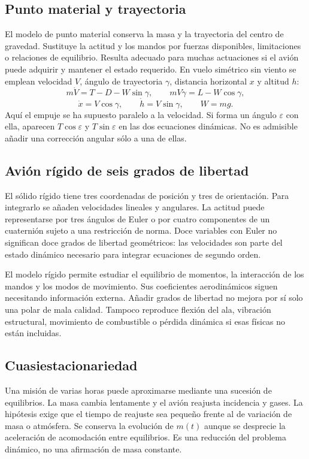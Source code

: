 \subsection{Punto material y trayectoria}
El modelo de punto material conserva la masa y la trayectoria del centro de gravedad. Sustituye la actitud y los mandos por fuerzas disponibles, limitaciones o relaciones de equilibrio. Resulta adecuado para muchas actuaciones si el avión puede adquirir y mantener el estado requerido. En vuelo simétrico sin viento se emplean velocidad $V$, ángulo de trayectoria $\gamma$, distancia horizontal $x$ y altitud $h$:
\begin{equation}
 m\dot V=T-D-W\sin\gamma,\qquad
 mV\dot\gamma=L-W\cos\gamma,
 \label{eq:punto-masa}
\end{equation}
\begin{equation}
 \dot x=V\cos\gamma,\qquad \dot h=V\sin\gamma,\qquad W=mg.
\end{equation}
Aquí el empuje se ha supuesto paralelo a la velocidad. Si forma un ángulo $\varepsilon$ con ella, aparecen $T\cos\varepsilon$ y $T\sin\varepsilon$ en las dos ecuaciones dinámicas. No es admisible añadir una corrección angular sólo a una de ellas.

\subsection{Avión rígido de seis grados de libertad}
El sólido rígido tiene tres coordenadas de posición y tres de orientación. Para integrarlo se añaden velocidades lineales y angulares. La actitud puede representarse por tres ángulos de Euler o por cuatro componentes de un cuaternión sujeto a una restricción de norma. Doce variables con Euler no significan doce grados de libertad geométricos: las velocidades son parte del estado dinámico necesario para integrar ecuaciones de segundo orden.

El modelo rígido permite estudiar el equilibrio de momentos, la interacción de los mandos y los modos de movimiento. Sus coeficientes aerodinámicos siguen necesitando información externa. Añadir grados de libertad no mejora por sí solo una polar de mala calidad. Tampoco reproduce flexión del ala, vibración estructural, movimiento de combustible o pérdida dinámica si esas físicas no están incluidas.

\subsection{Cuasiestacionariedad}
Una misión de varias horas puede aproximarse mediante una sucesión de equilibrios. La masa cambia lentamente y el avión reajusta incidencia y gases. La hipótesis exige que el tiempo de reajuste sea pequeño frente al de variación de masa o atmósfera. Se conserva la evolución de $m(t)$ aunque se desprecie la aceleración de acomodación entre equilibrios. Es una reducción del problema dinámico, no una afirmación de masa constante.

